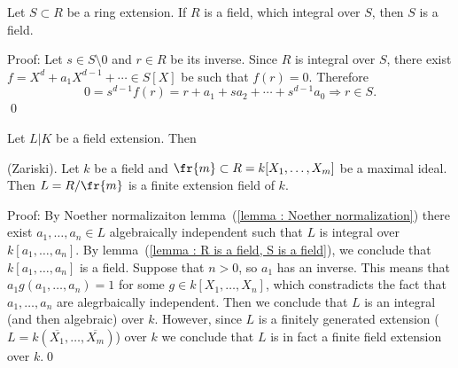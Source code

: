 \begin{dang}
    \begin{lemma}\label{lemma : R is a field, S is a field}
        Let $S\subset R$ be a ring extension. If $R$ is a field, which integral over $S$, then $S$ is a field. 
    \end{lemma}
\end{dang}
Proof: Let $s\in S\setminus0$ and $r\in R$ be its inverse. Since $R$ is integral over $S$, there exist
$f=X^d+a_1X^{d-1}+\cdots\in S[X]$ be such that $f(r)=0$. Therefore 
\begin{equation}
   0= s^{d-1}f(r) = r + a_1 + sa_2+\cdots + s^{d-1}a_0\Rightarrow r\in S.
\end{equation} 
\qed

\begin{remark}
    Let $L|K$ be a field extension. Then
    \begin{center}
    \end{center}
\end{remark}

\begin{dang}
    \begin{theorem}\label{theorem : Zariski 1}
        (Zariski). Let $k$ be a field and $\fr{m}\subset R=k[X_1,\dots, X_m]$ be a maximal ideal. Then $L=R/\fr{m}$ is 
        a finite extension field of $k$.
    \end{theorem}
\end{dang}
Proof: By Noether normalizaiton lemma~(\ref{lemma : Noether normalization}) there exist 
$a_1,\dots, a_n\in L$ algebraically independent such that $L$ is integral over $k[a_1,\dots,a_n]$. By lemma~(\ref{lemma : R is a field, S is a field}), 
we conclude that $k[a_1,\dots,a_n]$ is a field. Suppose that $n>0$, so $a_1$ has an inverse. This means that 
$a_1g(a_1,\dots, a_n) = 1$ for some $g\in k[X_1,\dots, X_n]$, which constradicts the fact that $a_1,\dots, a_n$ are 
alegrbaically independent. Then we conclude that $L$ is an integral (and then algebraic) over $k$. However, since 
$L$ is a finitely generated extension ($L=k(\overline{X_1},\dots,\overline{X_m})$) over $k$ we conclude that $L$ is in fact 
a finite field extension over $k$.\qed

